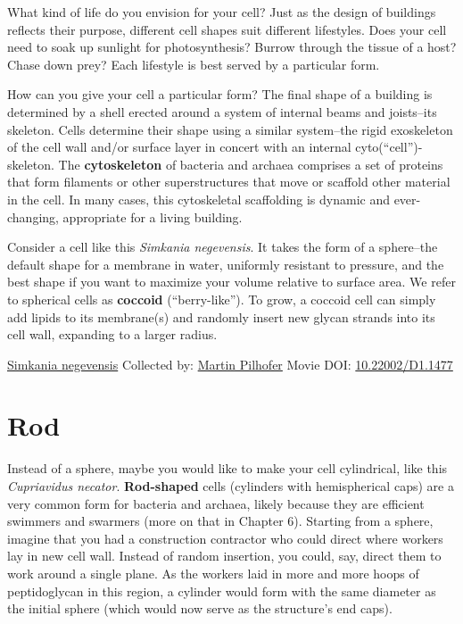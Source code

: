 \documentclass[]{tufte-book}
\begin{document}
What kind of life do you envision for your cell? Just as the design of buildings reflects their purpose, different cell shapes suit different lifestyles. Does your cell need to soak up sunlight for photosynthesis? Burrow through the tissue of a host? Chase down prey? Each lifestyle is best served by a particular form.

How can you give your cell a particular form? The final shape of a building is determined by a shell erected around a system of internal beams and joists--its skeleton. Cells determine their shape using a similar system--the rigid exoskeleton of the cell wall and/or surface layer in concert with an internal cyto(``cell'')-skeleton. The \textbf{cytoskeleton} of bacteria and archaea comprises a set of proteins that form filaments or other superstructures that move or scaffold other material in the cell. In many cases, this cytoskeletal scaffolding is dynamic and ever-changing, appropriate for a living building.

Consider a cell like this \emph{Simkania negevensis}. It takes the form of a sphere--the default shape for a membrane in water, uniformly resistant to pressure, and the best shape if you want to maximize your volume relative to surface area. We refer to spherical cells as \textbf{coccoid} (``berry-like''). To grow, a coccoid cell can simply add lipids to its membrane(s) and randomly insert new glycan strands into its cell wall, expanding to a larger radius.



\hypertarget{htmlwidget-ad3689c17df8710dbbe2}{}

\label{fig:3-1}\protect\hyperlink{tree}{Simkania negevensis} Collected by: \protect\hyperlink{martin_pilhofer}{Martin Pilhofer} Movie DOI: \href{https://doi.org/10.22002/D1.1477}{10.22002/D1.1477}

\hypertarget{rod}{%
\section{Rod}\label{rod}}

Instead of a sphere, maybe you would like to make your cell cylindrical, like this \emph{Cupriavidus necator}. \textbf{Rod-shaped} cells (cylinders with hemispherical caps) are a very common form for bacteria and archaea, likely because they are efficient swimmers and swarmers (more on that in Chapter 6). Starting from a sphere, imagine that you had a construction contractor who could direct where workers lay in new cell wall. Instead of random insertion, you could, say, direct them to work around a single plane. As the workers laid in more and more hoops of peptidoglycan in this region, a cylinder would form with the same diameter as the initial sphere (which would now serve as the structure's end caps).
\end{document}

